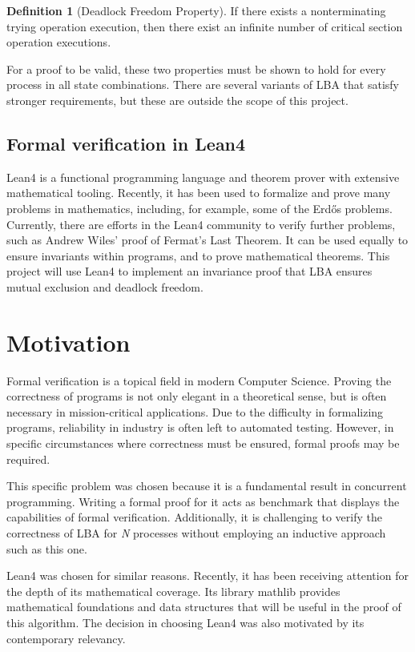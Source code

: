 \documentclass{article}
\theoremstyle{definition}
\newtheorem{definition}{Definition}[section]
\begin{document}
\begin{definition}[Deadlock Freedom Property]
    If there exists a nonterminating trying operation execution, then there exist an infinite number of critical section operation executions.
\end{definition}

\noindent
For a proof to be valid, these two properties must be shown to hold for every process in all state combinations. 
There are several variants of LBA that satisfy stronger requirements, but these are outside the scope of this project.

\subsection{Formal verification in Lean4}

Lean4 is a functional programming language and theorem prover with extensive mathematical tooling.
Recently, it has been used to formalize and prove many problems in mathematics, including, for example, some of the Erdős problems.
Currently, there are efforts in the Lean4 community to verify further problems, such as Andrew Wiles' proof of Fermat's Last Theorem. 
It can be used equally to ensure invariants within programs, and to prove mathematical theorems. 
This project will use Lean4 to implement an invariance proof that LBA ensures mutual exclusion and deadlock freedom.

\section{ Motivation }

Formal verification is a topical field in modern Computer Science. 
Proving the correctness of programs is not only elegant in a theoretical sense, but is often necessary in mission-critical applications.
Due to the difficulty in formalizing programs, reliability in industry is often left to automated testing. 
However, in specific circumstances where correctness must be ensured, formal proofs may be required. 

This specific problem was chosen because it is a fundamental result in concurrent programming. Writing a formal proof for it acts as benchmark that displays the capabilities of formal verification.
Additionally, it is challenging to verify the correctness of LBA for \emph{N} processes without employing an inductive approach such as this one.  

Lean4 was chosen for similar reasons.
Recently, it has been receiving attention for the depth of its mathematical coverage.
Its library mathlib provides mathematical foundations and data structures that will be useful in the proof of this algorithm.
The decision in choosing Lean4 was also motivated by its contemporary relevancy.
\end{document}
